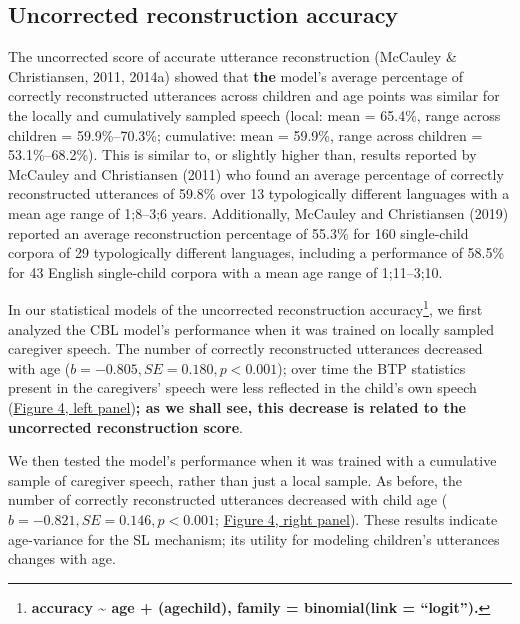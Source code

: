 \documentclass[man,mask,floatsintext]{apa6}
\let\rmarkdownfootnote\footnote%
\def\footnote{\protect\rmarkdownfootnote}
\begin{document}
\subsection{Uncorrected reconstruction
accuracy}\label{uncorrected-reconstruction-accuracy}

The uncorrected score of accurate utterance reconstruction (McCauley \&
Christiansen, 2011, 2014a) showed that \textbf{the} model's average
percentage of correctly reconstructed utterances across children and age
points was similar for the locally and cumulatively sampled speech
(local: mean = 65.4\%, range across children = 59.9\%--70.3\%;
cumulative: mean = 59.9\%, range across children = 53.1\%--68.2\%). This
is similar to, or slightly higher than, results reported by McCauley and
Christiansen (2011) who found an average percentage of correctly
reconstructed utterances of 59.8\% over 13 typologically different
languages with a mean age range of 1;8--3;6 years. Additionally,
McCauley and Christiansen (2019) reported an average reconstruction
percentage of 55.3\% for 160 single-child corpora of 29 typologically
different languages, including a performance of 58.5\% for 43 English
single-child corpora with a mean age range of 1;11--3;10.

In our statistical models of the uncorrected reconstruction
accuracy\footnote{\textbf{accuracy \textasciitilde{} age +
  (age\textbar{}child), family = binomial(link = \enquote{logit}).}}, we
first analyzed the CBL model's performance when it was trained on
locally sampled caregiver speech. The number of correctly reconstructed
utterances decreased with age (\(b = -0.805, SE = 0.180, p < 0.001\));
over time the BTP statistics present in the caregivers' speech were less
reflected in the child's own speech (\protect\hyperlink{fig4}{Figure 4,
left panel})\textbf{; as we shall see, this decrease is related to the
uncorrected reconstruction score}.

We then tested the model's performance when it was trained with a
cumulative sample of caregiver speech, rather than just a local sample.
As before, the number of correctly reconstructed utterances decreased
with child age (\(b=-0.821, SE = 0.146, p < 0.001\);
\protect\hyperlink{fig4}{Figure 4, right panel}). These results indicate
age-variance for the SL mechanism; its utility for modeling children's
utterances changes with age.
\end{document}
